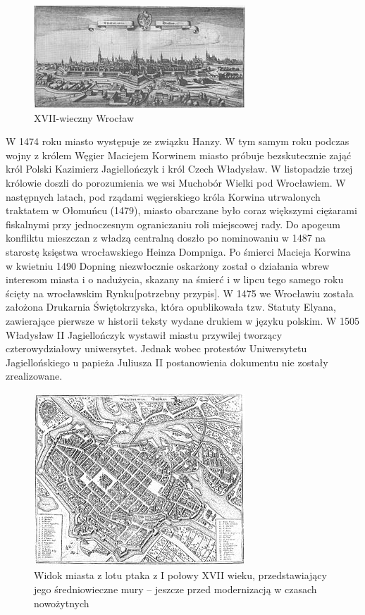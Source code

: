 \documentclass{article}
\begin{document}
\bigskip
\newline
\begin{figure}[h]
\centering
\includegraphics[scale=2]{3.JPG}
\caption{XVII-wieczny Wrocław}
\end{figure}
\bigskip
\newline
W 1474 roku miasto występuje ze związku Hanzy. W tym samym roku podczas wojny z królem Węgier Maciejem Korwinem miasto próbuje bezskutecznie zająć król Polski Kazimierz Jagiellończyk i król Czech Władysław. W listopadzie trzej królowie doszli do porozumienia we wsi Muchobór Wielki pod Wrocławiem. W następnych latach, pod rządami węgierskiego króla Korwina utrwalonych traktatem w Ołomuńcu (1479), miasto obarczane było coraz większymi ciężarami fiskalnymi przy jednoczesnym ograniczaniu roli miejscowej rady. Do apogeum konfliktu mieszczan z władzą centralną doszło po nominowaniu w 1487 na starostę księstwa wrocławskiego Heinza Dompniga. Po śmierci Macieja Korwina w kwietniu 1490 Dopning niezwłocznie oskarżony został o działania wbrew interesom miasta i o nadużycia, skazany na śmierć i w lipcu tego samego roku ścięty na wrocławskim Rynku[potrzebny przypis].
\bigskip
\newline
W 1475 we Wrocławiu została założona Drukarnia Świętokrzyska, która opublikowała tzw. Statuty Elyana, zawierające pierwsze w historii teksty wydane drukiem w języku polskim.
\bigskip
\newline
W 1505 Władysław II Jagiellończyk wystawił miastu przywilej tworzący czterowydziałowy uniwersytet. Jednak wobec protestów Uniwersytetu Jagiellońskiego u papieża Juliusza II postanowienia dokumentu nie zostały zrealizowane.
\bigskip
\newline
\begin{figure}[h]
\centering
\includegraphics[scale=2]{4.jpg}
\caption{Widok miasta z lotu ptaka z I połowy XVII wieku, przedstawiający jego średniowieczne mury – jeszcze przed modernizacją w czasach nowożytnych}
\end{figure}
\end{document}
